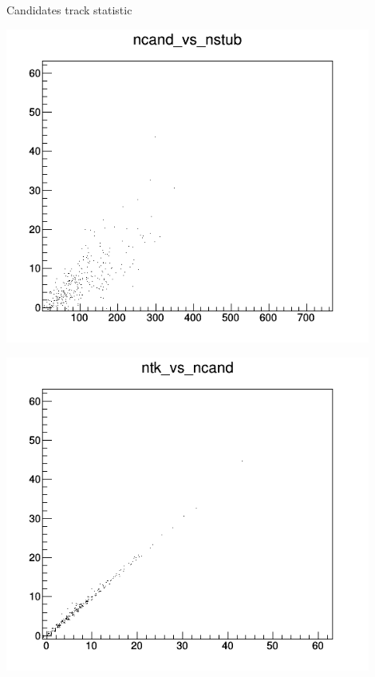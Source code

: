 \documentclass[10pt]{beamer}
\begin{document}
\begin{frame}{Candidates track statistic}
	\centerline{\includegraphics[width=0.9\textwidth,height=0.4\textheight]{ncand_vs_nstub.png}}
	\centerline{\includegraphics[width=0.9\textwidth,height=0.4\textheight]{ntk_vs_ncand.png}}
\end{frame}
\end{document}
